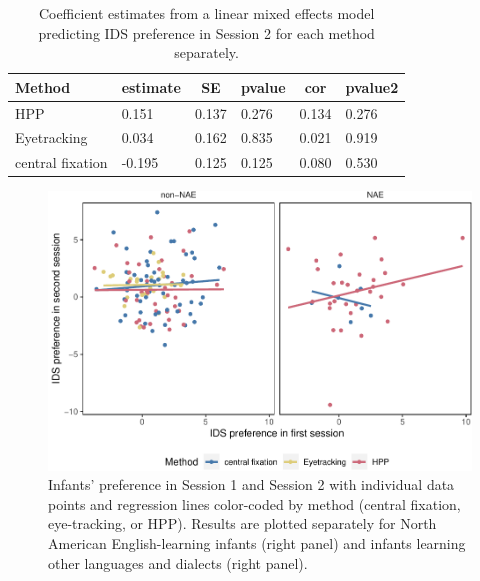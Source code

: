 \documentclass[
  man,floatsintext]{apa6}
\begin{document}
\begin{table}[tbp]

\begin{center}
\begin{threeparttable}

\caption{\label{tab:unnamed-chunk-6}Coefficient estimates from a linear mixed effects model predicting IDS preference in Session 2 for each method separately.}

\begin{tabular}{llllll}
\toprule
Method & \multicolumn{1}{c}{estimate} & \multicolumn{1}{c}{SE} & \multicolumn{1}{c}{pvalue} & \multicolumn{1}{c}{cor} & \multicolumn{1}{c}{pvalue2}\\
\midrule
HPP & 0.151 & 0.137 & 0.276 & 0.134 & 0.276\\
Eyetracking & 0.034 & 0.162 & 0.835 & 0.021 & 0.919\\
central fixation & -0.195 & 0.125 & 0.125 & 0.080 & 0.530\\
\bottomrule
\end{tabular}

\end{threeparttable}
\end{center}

\end{table}

\begin{figure}
\centering
\includegraphics{Retest_current_draft_files/figure-latex/fig1-1.pdf}
\caption{\label{fig:fig1}Infants' preference in Session 1 and Session 2 with individual data points and regression lines color-coded by method (central fixation, eye-tracking, or HPP). Results are plotted separately for North American English-learning infants (right panel) and infants learning other languages and dialects (right panel).}
\end{figure}
\end{document}
